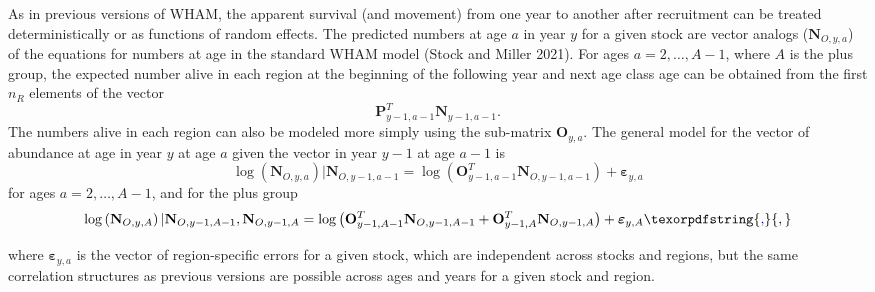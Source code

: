 \documentclass[
]{article}
\providecommand{\DIFaddtex}[1]{{\protect\color{blue}\uwave{#1}}} %
\providecommand{\DIFaddbegin}{} %
\providecommand{\DIFaddend}{} %
\providecommand{\DIFadd}[1]{\texorpdfstring{\DIFaddtex{#1}}{#1}} %
\newcommand{\DIFaddincludegraphics}[2][]{{\color{blue}\fbox{\DIFOincludegraphics[#1]{#2}}}} %
\DeclareRobustCommand{\DIFaddbegin}{\DIFOaddbegin \let\includegraphics\DIFaddincludegraphics} %
\DeclareRobustCommand{\DIFaddend}{\DIFOaddend \let\includegraphics\DIFOincludegraphics} %
\begin{document}
As in previous versions of WHAM, the apparent survival (and movement) from one year to another after recruitment can be treated deterministically or as functions of random effects. The predicted numbers at age \(a\) in year \(y\) for a given stock are vector analogs (\(\mathbf{N}_{O,y,a}\)) of the equations for numbers at age in the standard WHAM model (Stock and Miller 2021). For ages \(a = 2,\ldots, A-1\), where \(A\) is the plus group, the expected number alive in each region at the beginning of the following year and next age class age can be obtained from the first \(n_R\) elements of the vector
\[\mathbf{P}_{y-1,a-1}^T \mathbf{N}_{y-1,a-1}.\]
The numbers alive in each region can also be modeled more simply using the sub-matrix \(\mathbf{O}_{y,a}\). The general model for the vector of abundance at age in year \(y\) at age \(a\) given the vector in year \(y-1\) at age \(a-1\) is
\begin{equation*}
\log\left(\mathbf{N}_{O,y,a}\right)|\mathbf{N}_{O,y-1,a-1} =  \log\left(\mathbf{O}_{y-1,a-1}^T \mathbf{N}_{O,y-1,a-1}\right) + \boldsymbol{\varepsilon}_{y,a}
\end{equation*}
for ages \(a = 2,\ldots, A-1\), and for the plus group
\begin{equation*}
\log\left(\mathbf{N}_{O,y,A}\right)|\mathbf{N}_{O,y-1,A-1},\mathbf{N}_{O,y-1,A} = \log\left(\mathbf{O}_{y-1,A-1}^T \mathbf{N}_{O,y-1,A-1} + \mathbf{O}_{y-1,A}^T \mathbf{N}_{O,y-1,A}\right) + \boldsymbol{\varepsilon}_{y,A}\DIFaddbegin \DIFadd{,
}\DIFaddend \end{equation*}
where \(\boldsymbol{\varepsilon}_{y,a}\) is the vector of region-specific errors for a given stock, which are independent across stocks and regions, but the same correlation structures as previous versions are possible across ages and years for a given stock and region.
\end{document}
